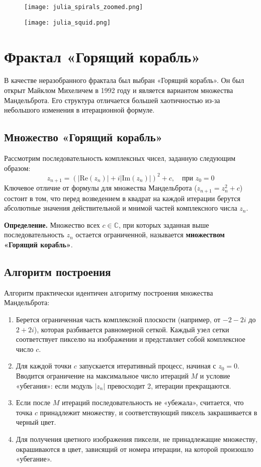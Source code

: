 \documentclass[a4paper,12pt]{article}
\begin{document}
\clearpage

\begin{figure}[h!]
    \centering
    \texttt{[image: julia\_spirals\_zoomed.png]}
    
    \vspace{0.5cm}
    
    \texttt{[image: julia\_squid.png]}
\end{figure}

\clearpage

\hypertarget{sec:8}{}
\section{\textbf{Фрактал «Горящий корабль»}}
В качестве неразобранного фрактала был выбран «Горящий корабль». Он был открыт Майклом Михеличем в 1992 году и является вариантом множества Мандельброта. Его структура отличается большей хаотичностью из-за небольшого изменения в итерационной формуле.

\subsection*{\textbf{Множество «Горящий корабль»}}
Рассмотрим последовательность комплексных чисел, заданную следующим образом:
$$ z_{n+1} = (|\text{Re}(z_n)| + i|\text{Im}(z_n)|)^2 + c, \quad \text{при } z_0 = 0 $$
Ключевое отличие от формулы для множества Мандельброта ($z_{n+1} = z_n^2 + c$) состоит в том, что перед возведением в квадрат на каждой итерации берутся абсолютные значения действительной и мнимой частей комплексного числа $z_n$.

\textbf{Определение.} Множество всех $c \in \mathbb{C}$, при которых заданная выше последовательность $z_n$ остается ограниченной, называется \textbf{множеством «Горящий корабль»}.

\subsection*{\textbf{Алгоритм построения}}
Алгоритм практически идентичен алгоритму построения множества Мандельброта:
\begin{enumerate}
    \item Берется ограниченная часть комплексной плоскости (например, от $-2 - 2i$ до $2 + 2i$), которая разбивается равномерной сеткой. Каждый узел сетки соответствует пикселю на изображении и представляет собой комплексное число $c$.
    \item Для каждой точки $c$ запускается итеративный процесс, начиная с $z_0 = 0$. Вводится ограничение на максимальное число итераций $M$ и условие «убегания»: если модуль $|z_n|$ превосходит 2, итерации прекращаются.
    \item Если после $M$ итераций последовательность не «убежала», считается, что точка $c$ принадлежит множеству, и соответствующий пиксель закрашивается в черный цвет.
    \item Для получения цветного изображения пиксели, не принадлежащие множеству, окрашиваются в цвет, зависящий от номера итерации, на которой произошло «убегание».
\end{enumerate}
\end{document}
